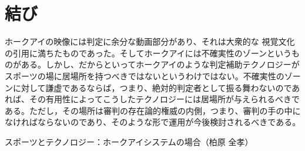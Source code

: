 \documentclass[twocolumn, a4j]{article}
\begin{document}
\section{結び}

ホークアイの映像には判定に余分な動画部分があり、それは大衆的な 視覚文化の引用に満ちたものであった。そしてホークアイには不確実性のゾーンというものがある。しかし、だからといってホークアイのような判定補助テクノロジーがスポーツの場に居場所を持つべきではないというわけではない。不確実性のゾーンに対して謙虚であるならば，つまり、絶対的判定者として振る舞わないのであれば、その有用性によってこうしたテクノロジーには居場所が与えられるべきである。ただし，その場所は審判の存在論的権威の内側，つまり、審判の手の中になければならないのであり、そのような形で運用が今後検討されるべきである。

\renewcommand{\refname}{参考文献}
\begin{thebibliography}{数字}
   スポーツとテクノロジー：ホークアイシステムの場合（柏原 全孝）
\end{thebibliography}
\end{document}
